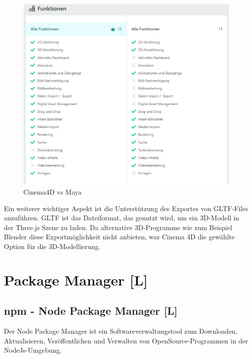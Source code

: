 \begin{figure} [h t]
    \centering
    \includegraphics[scale=0.7]{pics/c4d-vs-maya.PNG}
    \caption{Cinema4D vs Maya \cite{C4DvsMaya}}
    \label{fig:tech:front:c4d-vs-maya}
  \end{figure}

Ein weiterer wichtiger Aspekt ist die Unterstützung des Exportes von GLTF-Files anzuführen. GLTF ist das Dateiformat, das genutzt wird, um ein 3D-Modell in der Three.js Szene zu laden. Da alternative 3D-Programme wie zum Beispiel Blender diese Exportmöglichkeit nicht anbieten, war Cinema 4D die gewählte Option für die 3D-Modellierung.   

\section{Package Manager [L]}
\subsection{npm - Node Package Manager [L]}
Der Node Package Manager ist ein Softwareverwaltungstool zum Downloaden, Aktualisieren, Veröffentlichen und Verwalten von OpenSource-Programmen in der NodeJs-Umgebung. \cite{whatNpm} \cite{AboutNpm}


